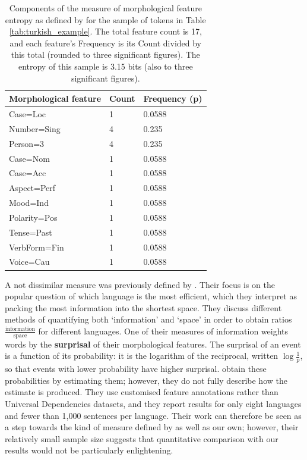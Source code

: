 \documentclass[USenglish]{article}
\begin{document}
\begin{table}[h]
    \centering
    \caption{Components of the measure of morphological feature entropy as defined by \citet{ccoltekin2023complexity} for the sample of tokens in Table \ref{tab:turkish_example}. The total feature count is 17, and each feature's Frequency is its Count divided by this total (rounded to three significant figures). The entropy of this sample is 3.15 bits (also to three significant figures).} %
    \label{tab:mfh}   
    \begin{tabular}{p{5cm}p{3cm}p{3cm}}
\toprule
	\textbf{Morphological feature}	&	\textbf{Count}	&	\textbf{Frequency (p)}	\\
    \midrule
	Case=Loc&1&0.0588       \\    \midrule
	Number=Sing&4&0.235    \\    \midrule
        Person=3&4&0.235		   \\    \midrule
	Case=Nom&1&0.0588	       \\    \midrule
	Case=Acc&1&0.0588		      \\    \midrule
        Aspect=Perf&1&0.0588      \\    \midrule
        Mood=Ind&1&0.0588		   \\    \midrule
        Polarity=Pos&1&0.0588		\\    \midrule
	Tense=Past&1&0.0588	     \\    \midrule
	VerbForm=Fin&1&0.0588	    \\    \midrule
	Voice=Cau&1&0.0588      	\\ \bottomrule

    \end{tabular}
\end{table}

A not dissimilar measure was previously defined by \citet{SPROAT14.47}.
Their focus is on the popular question of which language is the most efficient, which they interpret as packing the most information into the shortest space.
They discuss different methods of quantifying both `information' and `space' in order to obtain ratios $\frac{\text{information}}{\text{space}}$ for different languages.
One of their measures of information weights words by the \textbf{surprisal} of their morphological features.
The surprisal of an event is a function of its probability: it is the logarithm of the reciprocal, written $\log{\frac{1}{p}}$, so that events with lower probability have higher surprisal.
\citet{SPROAT14.47} obtain these probabilities by estimating them; however, they do not fully describe how the estimate is produced.
They use customised feature annotations rather than Universal Dependencies datasets, and they report results for only eight languages and fewer than 1,000 sentences per language.
Their work can therefore be seen as a step towards the kind of measure defined by \citet{ccoltekin2023complexity} as well as our own; however, their relatively small sample size suggests that quantitative comparison with our results would not be particularly enlightening.
\end{document}
